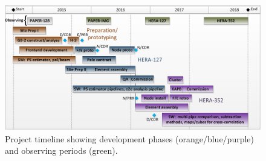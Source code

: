 \documentclass[preprint]{aastex}
\newcommand{\Caption}[4]{\vspace{#1}\renewcommand{\baselinestretch}{#2}\caption{#4}\vspace{#3}}
\begin{document}

\begin{figure}[t]\centering
\includegraphics[width=5.5in]{otherdocs/schedule.png}
\Caption{-0.1in}{0.99}{-0.1in}{\small Project timeline showing development phases (orange/blue/purple) and observing periods (green).}
\label{fig:timeline}
\end{figure}
\end{document}

